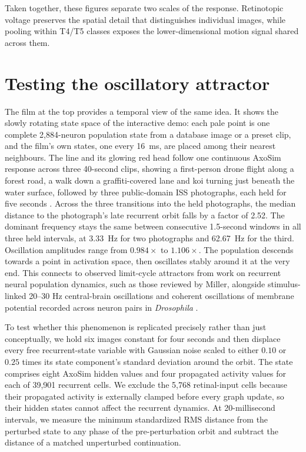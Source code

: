 \documentclass[11pt]{article}
\begin{document}
Taken together, these figures separate two scales of the response. Retinotopic voltage preserves the spatial detail that distinguishes individual images, while pooling within T4/T5 classes exposes the lower-dimensional motion signal shared across them.

\section{Testing the oscillatory attractor}

The film at the top provides a temporal view of the same idea. It shows the slowly rotating state space of the interactive demo: each pale point is one complete 2,884-neuron population state from a database image or a preset clip, and the film's own states, one every 16~ms, are placed among their nearest neighbours. The line and its glowing red head follow one continuous AxoSim response across three 40-second clips, showing a first-person drone flight along a forest road, a walk down a graffiti-covered lane and koi turning just beneath the water surface, followed by three public-domain ISS photographs, each held for five seconds \cite{nasaiss}. Across the three transitions into the held photographs, the median distance to the photograph's late recurrent orbit falls by a factor of 2.52. The dominant frequency stays the same between consecutive 1.5-second windows in all three held intervals, at 3.33~Hz for two photographs and 62.67~Hz for the third. Oscillation amplitudes range from $0.984\times$ to $1.106\times$. The population descends towards a point in activation space, then oscillates stably around it at the very end. This connects to observed limit-cycle attractors from work on recurrent neural population dynamics, such as those reviewed by Miller, alongside stimulus-linked 20--30 Hz central-brain oscillations and coherent oscillations of membrane potential recorded across neuron pairs in \textit{Drosophila} \cite{miller2016,grabowska2020,franco2025}.

To test whether this phenomenon is replicated precisely rather than just conceptually, we hold six images constant for four seconds and then displace every free recurrent-state variable with Gaussian noise scaled to either $0.10$ or $0.25$ times its state component's standard deviation around the orbit. The state comprises eight AxoSim hidden values and four propagated activity values for each of 39,901 recurrent cells. We exclude the 5,768 retinal-input cells because their propagated activity is externally clamped before every graph update, so their hidden states cannot affect the recurrent dynamics. At 20-millisecond intervals, we measure the minimum standardized RMS distance from the perturbed state to any phase of the pre-perturbation orbit and subtract the distance of a matched unperturbed continuation.
\end{document}

